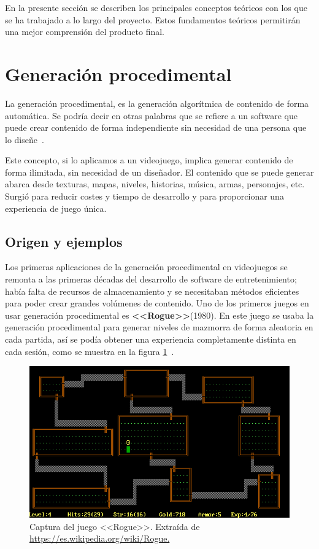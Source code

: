 
En la presente sección se describen los principales conceptos teóricos con los que se ha trabajado a lo largo del proyecto. Estos fundamentos teóricos permitirán una mejor comprensión del producto final.

\section{Generación procedimental}
La generación procedimental, es la generación algorítmica de contenido de forma automática. Se podría decir en otras palabras que se refiere a un software que puede crear contenido de forma independiente sin necesidad de una persona que lo diseñe~\cite{proceduralgenbooknoor}.

Este concepto, si lo aplicamos a un videojuego, implica generar contenido de forma ilimitada, sin necesidad de un diseñador. El contenido que se puede generar abarca desde texturas, mapas, niveles, historias, música, armas, personajes, etc. Surgió para reducir costes y tiempo de desarrollo y para proporcionar una experiencia de juego única.

\subsection{Origen y ejemplos}
Los primeras aplicaciones de la generación procedimental en videojuegos se remonta a las primeras décadas del desarrollo de software de entretenimiento; había falta de recursos de almacenamiento y se necesitaban métodos eficientes para poder crear grandes volúmenes de contenido. Uno de los primeros juegos en usar generación procedimental es \textbf{<<Rogue>>}(1980). En este juego se usaba la generación procedimental para generar niveles de mazmorra de forma aleatoria en cada partida, así se podía obtener una experiencia completamente distinta en cada sesión, como se muestra en la figura \ref{fig:CaputraRogue}~\cite{proceduralgenbooknoor}.
\begin{figure}[h!]  
    \centering  
    \includegraphics[width=\textwidth]{img/Rogue_Captura.PNG}  
    \caption{Captura del juego <<Rogue>>. Extraída de \url{https://es.wikipedia.org/wiki/Rogue.}}  
    \label{fig:CaputraRogue}
\end{figure}

